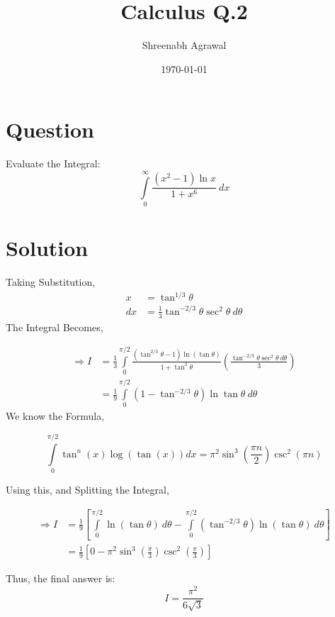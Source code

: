 \documentclass{article}
\title{Calculus Q.2}
\author{Shreenabh Agrawal}
\date{\today}
\begin{document}
\maketitle

\section{Question}

Evaluate the Integral:
$$\int\limits_{0}^{\infty} \frac{\left(x^{2}-1\right) \ln x}{1+x^{6}} \: d x$$
\section{Solution}

Taking Substitution,
$$\begin{aligned}
x &=\tan ^{1 / 3} \theta \\
d x &=\frac{1}{3} \tan ^{-2 / 3} \theta \sec ^{2} \theta \: d \theta
\end{aligned}$$
The Integral Becomes,

$$\begin{aligned}
{\Rightarrow} I &=\frac{1}{3} \int\limits_{0}^{\pi / 2} \frac{\left(\tan ^{2 / 3} \theta-1\right) \ln (\tan \theta)}{1+\tan ^{2} \theta}\left(\frac{\tan ^{-2 / 3} \theta \sec ^{2} \theta \: d \theta}{3}\right) \\
&=\frac{1}{9} \int\limits_{0}^{\pi / 2}\left(1-\tan ^{-2 / 3} \theta\right) \ln \tan \theta \: d \theta
\end{aligned}$$
We know the Formula,

$$\int\limits_{0}^{\pi / 2} \tan ^{n}(x) \log (\tan (x)) d x=\pi^{2} \sin ^{3}\left(\frac{\pi n}{2}\right) \csc ^{2}(\pi n)$$

\begin{flushright}
[For $-1<n<1$]
\end{flushright}
Using this, and Splitting the Integral,

$$\begin{aligned}
\Rightarrow I  
&= \frac{1}{9}\left[\int\limits_{0}^{\pi / 2} \ln (\tan \theta) \: d \theta-\int\limits_{0}^{\pi / 2}\left(\tan ^{-2 / 3} \theta\right) \ln (\tan \theta) \: d \theta\right]\\
&=\frac{1}{9}\left[0-\pi^{2} \sin ^{3}\left(\frac{\pi}{3}\right) \csc ^{2}\left(\frac{\pi}{3}\right)\right]
\end{aligned}$$

Thus, the final answer is:
$$\boxed{I=\frac{\pi^{2}}{6 \sqrt{3}}}$$
\end{document}
